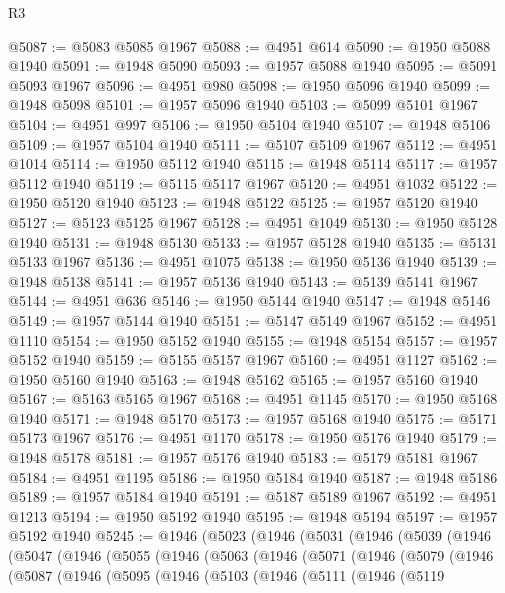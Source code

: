 \begin{lexlean}{R3}
\begin{coremodule}
@5087 := @5083 @5085 @1967
@5088 := @4951 @614
@5090 := @1950 @5088 @1940
@5091 := @1948 @5090
@5093 := @1957 @5088 @1940
@5095 := @5091 @5093 @1967
@5096 := @4951 @980
@5098 := @1950 @5096 @1940
@5099 := @1948 @5098
@5101 := @1957 @5096 @1940
@5103 := @5099 @5101 @1967
@5104 := @4951 @997
@5106 := @1950 @5104 @1940
@5107 := @1948 @5106
@5109 := @1957 @5104 @1940
@5111 := @5107 @5109 @1967
@5112 := @4951 @1014
@5114 := @1950 @5112 @1940
@5115 := @1948 @5114
@5117 := @1957 @5112 @1940
@5119 := @5115 @5117 @1967
@5120 := @4951 @1032
@5122 := @1950 @5120 @1940
@5123 := @1948 @5122
@5125 := @1957 @5120 @1940
@5127 := @5123 @5125 @1967
@5128 := @4951 @1049
@5130 := @1950 @5128 @1940
@5131 := @1948 @5130
@5133 := @1957 @5128 @1940
@5135 := @5131 @5133 @1967
@5136 := @4951 @1075
@5138 := @1950 @5136 @1940
@5139 := @1948 @5138
@5141 := @1957 @5136 @1940
@5143 := @5139 @5141 @1967
@5144 := @4951 @636
@5146 := @1950 @5144 @1940
@5147 := @1948 @5146
@5149 := @1957 @5144 @1940
@5151 := @5147 @5149 @1967
@5152 := @4951 @1110
@5154 := @1950 @5152 @1940
@5155 := @1948 @5154
@5157 := @1957 @5152 @1940
@5159 := @5155 @5157 @1967
@5160 := @4951 @1127
@5162 := @1950 @5160 @1940
@5163 := @1948 @5162
@5165 := @1957 @5160 @1940
@5167 := @5163 @5165 @1967
@5168 := @4951 @1145
@5170 := @1950 @5168 @1940
@5171 := @1948 @5170
@5173 := @1957 @5168 @1940
@5175 := @5171 @5173 @1967
@5176 := @4951 @1170
@5178 := @1950 @5176 @1940
@5179 := @1948 @5178
@5181 := @1957 @5176 @1940
@5183 := @5179 @5181 @1967
@5184 := @4951 @1195
@5186 := @1950 @5184 @1940
@5187 := @1948 @5186
@5189 := @1957 @5184 @1940
@5191 := @5187 @5189 @1967
@5192 := @4951 @1213
@5194 := @1950 @5192 @1940
@5195 := @1948 @5194
@5197 := @1957 @5192 @1940
@5245 := @1946
    (@5023
      (@1946
        (@5031
          (@1946
            (@5039
              (@1946
                (@5047
                  (@1946
                    (@5055
                      (@1946
                        (@5063
                          (@1946
                            (@5071
                              (@1946
                                (@5079
                                  (@1946
                                    (@5087
                                      (@1946
                                        (@5095
                                          (@1946
                                            (@5103
                                              (@1946
                                                (@5111
                                                  (@1946
                                                    (@5119

\end{coremodule}
\end{lexlean}
